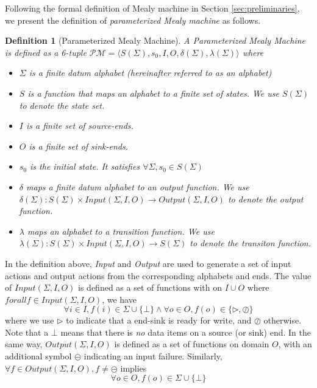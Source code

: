 \documentclass[conference, a4paper]{IEEEtran}
\newtheorem{definition}{Definition}
\newcommand{\rblock}[0]{\circleddash}
\newcommand{\rread}[0]{\rhd}
\newcommand{\rnoread}[0]{\oslash}
\begin{document}
Following the formal definition of Mealy machine in Section \ref{sec:preliminaries}, we present the
definition of \emph{parameterized Mealy machine} as follows.

\begin{definition}[Parameterized Mealy Machine]
  A \emph{Parameterized Mealy Machine} is defined as a 6-tuple $\mathcal{PM}=\langle
  S(\Sigma), s_0, I, O, \delta(\Sigma), \lambda(\Sigma)\rangle$ where 
  \begin{itemize}
    \item[-] $\Sigma$ is a \emph{finite} datum alphabet (hereinafter referred to as an alphabet)
    \item[-] $S$ is a function that maps an alphabet to a \emph{finite} set of
      states. We use $S(\Sigma)$ to denote the state set.
    \item[-] $I$ is a finite set of source-ends.
    \item[-] $O$ is a finite set of sink-ends.
    \item[-] $s_0$ is the initial state. It satisfies $\forall \Sigma,s_0\in S(\Sigma)$
    \item[-] $\delta$ maps a \emph{finite} datum alphabet to an \emph{output function}. We use
      $\delta(\Sigma):S(\Sigma)\times Input(\Sigma,I,O)\rightarrow Output(\Sigma,I,O)$ to denote the
      output function.
    \item[-] $\lambda$ maps an alphabet to a \emph{transition function}. We use
      $\lambda(\Sigma):S(\Sigma)\times Input(\Sigma,I,O)\rightarrow S(\Sigma)$ to denote the transiton
      function.
  \end{itemize}
\end{definition}

In the definition above, \emph{Input} and \emph{Output} are used to generate a set of input actions
and output actions from the corresponding alphabets and ends. The value of $Input(\Sigma,I,O)$ is
defined as a set of functions with on $I\cup O$ where $forall f\in Input(\Sigma,I,O)$, we have
\[
\forall i\in I, f(i)\in \Sigma\cup\{\bot\}\land \forall o\in
O,f(o)\in\{\rread, \rnoread\}
\]
where we use $\rread$ to indicate that a end-sink is ready for write, and $\rnoread$ otherwise. Note
that a $\bot$ means that there is \emph{no} data items on a source (or sink) end. In the same way,
$Output(\Sigma,I,O)$ is defined as a set of functions on domain $O$, with an additional symbol
$\rblock$ indicating an input failure. Similarly, $\forall f\in Output(\Sigma,I,O), f\neq \rblock$
implies
\[
\forall o\in O, f(o)\in \Sigma\cup\{\bot\}
\]
\end{document}
